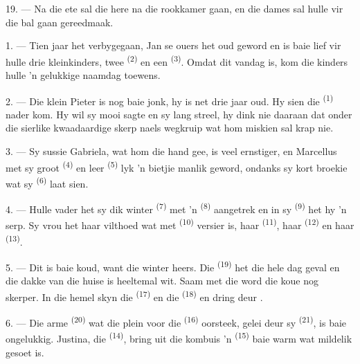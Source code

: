 19. --- Na die ete sal die here na die rookkamer gaan, en die dames sal hulle vir die
bal gaan gereedmaak.

\VUsaut{5.0mm}
\VUsaut{1.6mm}
\VUsaut{2.6mm}

\VUsaut{3.0mm}

1. --- Tien jaar het verbygegaan, Jan se ouers het oud geword en is baie lief vir hulle
drie kleinkinders, twee  \textsuperscript{(2)} en een
 \textsuperscript{(3)}. Omdat dit vandag  is, kom die kinders hulle 'n gelukkige naamdag toewens.

2. --- Die klein Pieter is nog baie jonk, hy is net drie jaar oud. Hy sien die
 \textsuperscript{(1)} nader kom. Hy wil sy mooi sagte  en sy
lang  streel, hy dink nie daaraan dat onder die sierlike 
kwaadaardige skerp naels wegkruip wat hom miskien sal krap nie.

3. --- Sy sussie Gabriela, wat hom die hand gee, is veel ernstiger, en Marcellus met sy
groot  \textsuperscript{(4)} en leer  \textsuperscript{(5)}
lyk 'n bietjie manlik geword, ondanks sy kort broekie wat sy 
\textsuperscript{(6)} laat sien.

4. --- Hulle vader het sy dik winter \textsuperscript{(7)} met 'n
 \textsuperscript{(8)} aangetrek en in sy 
\textsuperscript{(9)} het hy 'n serp. Sy vrou het haar vilthoed wat met 
\textsuperscript{(10)} versier is, haar  \textsuperscript{(11)}, haar
 \textsuperscript{(12)} en haar  \textsuperscript{(13)}.

5. --- Dit is baie koud, want die winter heers. Die  \textsuperscript{(19)}
het die hele dag geval en die dakke van die huise is heeltemal wit. Saam met die
 word die koue nog skerper. In die hemel skyn die 
\textsuperscript{(17)} en die  \textsuperscript{(18)} en dring deur
.

\VUsaut{4.2mm}
\VUsaut{3.0mm}

6. --- Die arme  \textsuperscript{(20)} wat die plein voor die
 \textsuperscript{(16)} oorsteek, gelei deur sy 
\textsuperscript{(21)}, is baie ongelukkig. Justina, die 
\textsuperscript{(14)}, bring uit die kombuis 'n  \textsuperscript{(15)}
baie warm  wat mildelik gesoet is.

